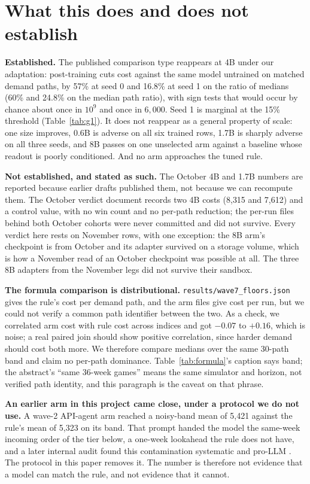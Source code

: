 \documentclass[11pt]{article}
\begin{document}
\section{What this does and does not establish}\label{sec:solid}

\textbf{Established.} The published comparison type reappears at 4B under our adaptation: post-training
cuts cost against the same model untrained on matched demand paths, by 57\% at seed 0 and 16.8\% at
seed 1 on the ratio of medians (60\% and 24.8\% on the median path ratio), with sign tests that would
occur by chance about once in $10^{9}$ and once in $6{,}000$. Seed 1 is marginal at the 15\% threshold
(Table~\ref{tab:g1}). It does not
reappear as a general property of scale: one size improves, 0.6B is adverse on all six trained rows,
1.7B is sharply adverse on all three seeds, and 8B passes on one unselected arm against a baseline
whose readout is poorly conditioned. And no arm approaches the tuned rule.

\textbf{Not established, and stated as such.} The October 4B and 1.7B numbers are reported because
earlier drafts published them, not because we can recompute them. The October verdict document records
two 4B costs (8{,}315 and 7{,}612) and a control value, with no win count and no per-path reduction; the
per-run files behind both October cohorts were never committed and did not survive. Every verdict here
rests on November rows, with one exception: the 8B arm's checkpoint is from October and its adapter
survived on a storage volume, which is how a November read of an October checkpoint was possible at
all. The three 8B adapters from the November legs did not survive their sandbox.

\textbf{The formula comparison is distributional.} \texttt{results/wave7\_floors.json} gives the rule's
cost per demand path, and the arm files give cost per run, but we could not verify a common path
identifier between the two. As a check, we correlated arm cost with rule cost across indices and got
$-0.07$ to $+0.16$, which is noise; a real paired join should show positive correlation, since harder
demand should cost both more. We therefore compare medians over the same 30-path band and claim no
per-path dominance. Table~\ref{tab:formula}'s caption says band; the abstract's ``same 36-week games''
means the same simulator and horizon, not verified path identity, and this paragraph is the caveat on
that phrase.

\textbf{An earlier arm in this project came close, under a protocol we do not use.} A wave-2 API-agent
arm reached a noisy-band mean of 5{,}421 against the rule's mean of 5{,}323 on its band. That prompt handed the model
the same-week incoming order of the tier below, a one-week lookahead the rule does not have, and a
later internal audit found this contamination systematic and pro-LLM \cite{audit}. The protocol in
this paper removes it. The number is therefore not evidence that a model can match the rule, and not
evidence that it cannot.
\end{document}
